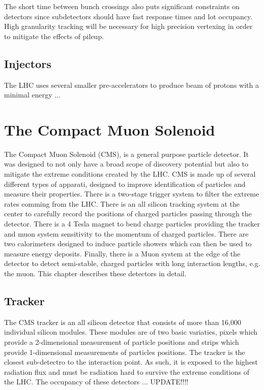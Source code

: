 The short time between bunch crossings also puts significant constraints on 
detectors since subdetectors should have fast response times and lot occupancy. 
High granularity tracking will be necessary for high precision vertexing in
order to mitigate the effects of pileup.




\subsection{Injectors}
\label{sec:Injectors}

The LHC uses several smaller pre-accelerators to produce beam of protons with 
a minimal energy ...

\section{The Compact Muon Solenoid}
\label{sec:CMS}

The Compact Muon Solenoid (CMS), is a general purpose particle detector.  It
was designed to not only have a broad scope of discovery potential but also
to mitigate the extreme conditions created by the LHC.  CMS is made up of
several different types of apparati, designed to improve identification of 
particles and measure their properties.  There is a two-stage trigger system
to filter the extreme rates comming from the LHC.  There is an all silicon tracking 
system at the center to carefully record the positions of charged particles passing 
through the detector.  There is a 4 Tesla magnet to bend charge particles 
providing the tracker and muon system sensitivity to the momentum of charged 
particles.  There are two calorimeters designed to induce particle showers which 
can then be used to measure energy deposits.  Finally, there is a Muon system 
at the edge of the detector to detect semi-stable, charged particles with long 
interaction lengths, e.g. the muon. This chapter describes these detectors in
detail. 

\subsection{Tracker}
\label{sec:Tracker}

The CMS tracker is an all silicon detector that consists of more than 16,000
individual silicon modules.  These modules are of two basic variaties, pixels
which provide a 2-dimensional measurement of particle positions and strips
which provide 1-dimensional measurements of particles positions.  The tracker
is the closest sub-detectro to the interaction point.  As such, it is exposed to
the highest radiation flux and must be radiation hard to survive the extreme
conditions of the LHC.  The occupancy of these detectors ... UPDATE!!!!
